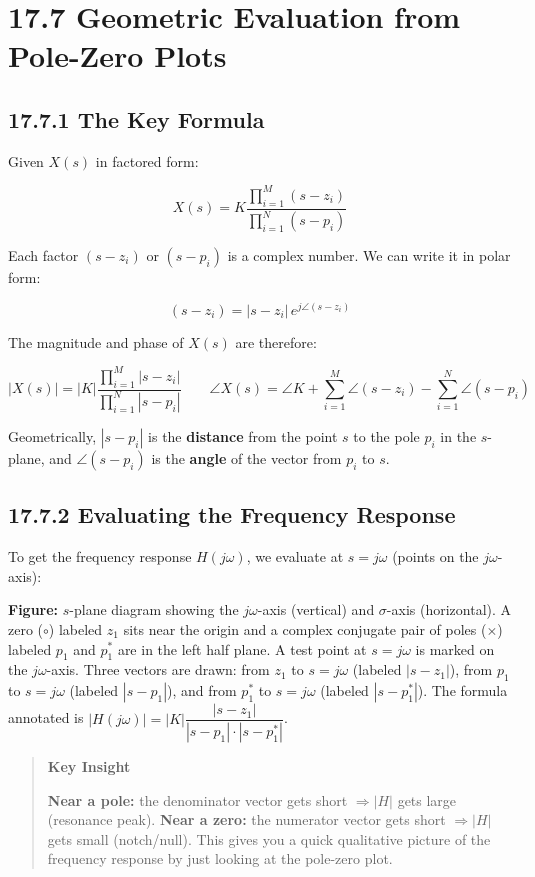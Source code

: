 \documentclass[11pt]{article}
\begin{document}
\section*{17.7 Geometric Evaluation from Pole-Zero Plots}

\subsection*{17.7.1 The Key Formula}

Given $X(s)$ in factored form:

\[X(s) = K \frac{\prod_{i=1}^{M} (s - z_i)}{\prod_{i=1}^{N} (s - p_i)}\]

Each factor $(s - z_i)$ or $(s - p_i)$ is a complex number. We can write it in polar form:

\[(s - z_i) = |s - z_i|\, e^{j \angle (s - z_i)}\]

The magnitude and phase of $X(s)$ are therefore:

\[\boxed{|X(s)| = |K| \frac{\prod_{i=1}^{M} |s - z_i|}{\prod_{i=1}^{N} |s - p_i|}} \qquad \boxed{\angle X(s) = \angle K + \sum_{i=1}^{M} \angle (s - z_i) - \sum_{i=1}^{N} \angle (s - p_i)}\]

Geometrically, $|s - p_i|$ is the \textbf{distance} from the point $s$ to the pole $p_i$ in the $s$-plane, and $\angle (s - p_i)$ is the \textbf{angle} of the vector from $p_i$ to $s$.

\subsection*{17.7.2 Evaluating the Frequency Response}

To get the frequency response $H(j\omega)$, we evaluate at $s = j\omega$ (points on the $j\omega$-axis):

\textbf{Figure:} $s$-plane diagram showing the $j\omega$-axis (vertical) and $\sigma$-axis (horizontal). A zero ($\circ$) labeled $z_1$ sits near the origin and a complex conjugate pair of poles ($\times$) labeled $p_1$ and $p_1^*$ are in the left half plane. A test point at $s = j\omega$ is marked on the $j\omega$-axis. Three vectors are drawn: from $z_1$ to $s = j\omega$ (labeled $|s - z_1|$), from $p_1$ to $s = j\omega$ (labeled $|s - p_1|$), and from $p_1^*$ to $s = j\omega$ (labeled $|s - p_1^*|$). The formula annotated is $|H(j\omega)| = |K| \dfrac{|s - z_1|}{|s - p_1| \cdot |s - p_1^*|}$.

\begin{quote}
\textbf{Key Insight}

\textbf{Near a pole:} the denominator vector gets short $\Rightarrow |H|$ gets large (resonance peak).
\textbf{Near a zero:} the numerator vector gets short $\Rightarrow |H|$ gets small (notch/null).
This gives you a quick qualitative picture of the frequency response by just looking at the pole-zero plot.
\end{quote}
\end{document}
